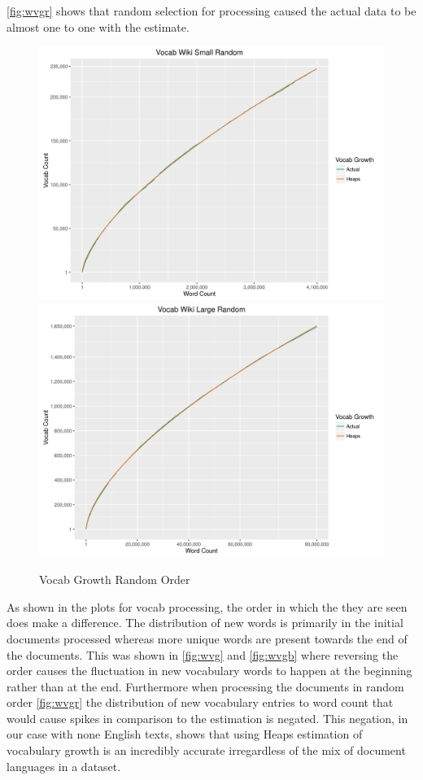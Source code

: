 \documentclass[11pt]{article}
\begin{document}
\autoref{fig:wvgr} shows that random selection for processing caused the actual data to be almost one to one with the estimate.   
\begin{figure}[H]
\centering
\includegraphics[scale=0.7]{wikiSmallVR.png}
\includegraphics[scale=0.7]{wikiLargeVGR.png}
\caption{Vocab Growth Random Order}
\label{fig:wvgr}
\end{figure}
\noindent As shown in the plots for vocab processing, the order in which the they are seen does make a difference. The distribution of new words is primarily in the initial documents processed whereas more unique words are present towards the end of the documents. This was shown in  \autoref{fig:wvg} and \autoref{fig:wvgb} where reversing the order causes the fluctuation in new vocabulary words to happen at the beginning rather than at the end. Furthermore when processing the documents in random order \autoref{fig:wvgr} the distribution of new vocabulary entries to word count that would cause spikes in comparison to the estimation is negated. This negation, in our case with none English texts, shows that using Heaps estimation of vocabulary growth is an incredibly accurate irregardless of the mix of document languages in a dataset. \newline \newline  
\end{document}
